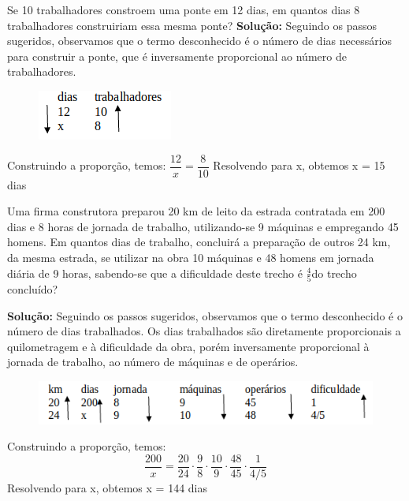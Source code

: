 \begin{texemplo} 
	Se 10 trabalhadores constroem uma ponte em 12 dias, em quantos dias 8 trabalhadores construiriam essa mesma ponte?
	\textbf{Solução:}  Seguindo os passos sugeridos, observamos que o termo desconhecido é o número de dias necessários para construir a ponte, que é inversamente proporcional ao número de trabalhadores.  
	\begin{figure}[H]
		\begin{center}
			\includegraphics{capitulos/grandezas_proporcionais/media/image09.png}
		\end{center}
	\end{figure}

	Construindo a proporção, temos: $\dfrac{12}{x}=\dfrac{8}{10}$
	Resolvendo para x, obtemos  x = 15 dias \qedsymbol{}
\end{texemplo}

\begin{texemplo} 

Uma firma construtora preparou 20 km de leito da estrada contratada em 200 dias e 8 horas de jornada de trabalho, utilizando-se 9 máquinas e empregando 45 homens. Em quantos dias de trabalho, concluirá a preparação de outros 24 km, da mesma estrada, se utilizar na obra 10 máquinas e 48 homens em jornada diária de 9 horas, sabendo-se que a dificuldade deste trecho é $\frac{4}{5}$do trecho concluído?    

\textbf{Solução:} Seguindo os passos sugeridos, observamos que o termo desconhecido é o número de dias trabalhados. Os dias trabalhados são diretamente proporcionais a quilometragem e à dificuldade da obra, porém inversamente proporcional à jornada de trabalho, ao número de máquinas e de operários. 
\begin{figure}[H]
	\begin{center}
		\includegraphics{capitulos/grandezas_proporcionais/media/image10.png}
	\end{center}
\end{figure}

Construindo a proporção, temos:
$$\dfrac{200}{x}=\dfrac{20}{24}\cdot \dfrac{9}{8}\cdot \dfrac{10}{9} \cdot \dfrac{48}{45} \cdot \dfrac{1}{4/5}$$
Resolvendo para x, obtemos  x = 144 dias  \qedsymbol{}
\end{texemplo}

